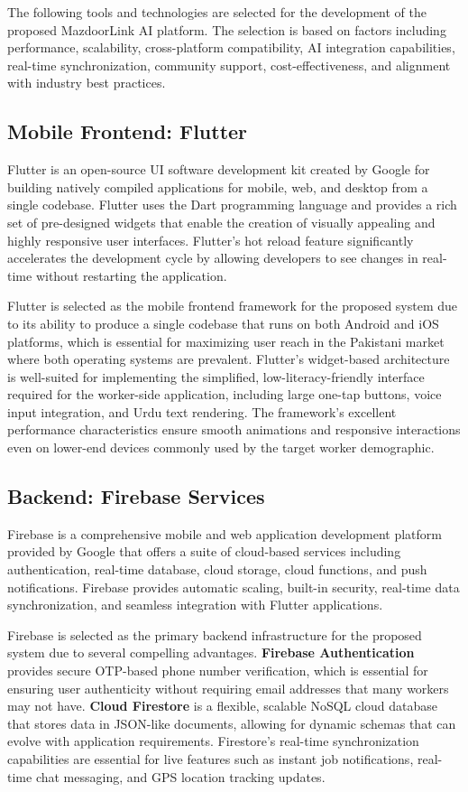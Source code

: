 \documentclass[12pt,a4paper]{report}
\begin{document}
The following tools and technologies are selected for the development of the proposed MazdoorLink AI platform. The selection is based on factors including performance, scalability, cross-platform compatibility, AI integration capabilities, real-time synchronization, community support, cost-effectiveness, and alignment with industry best practices.

\subsection{Mobile Frontend: Flutter}
Flutter is an open-source UI software development kit created by Google for building natively compiled applications for mobile, web, and desktop from a single codebase. Flutter uses the Dart programming language and provides a rich set of pre-designed widgets that enable the creation of visually appealing and highly responsive user interfaces. Flutter's hot reload feature significantly accelerates the development cycle by allowing developers to see changes in real-time without restarting the application.

Flutter is selected as the mobile frontend framework for the proposed system due to its ability to produce a single codebase that runs on both Android and iOS platforms, which is essential for maximizing user reach in the Pakistani market where both operating systems are prevalent. Flutter's widget-based architecture is well-suited for implementing the simplified, low-literacy-friendly interface required for the worker-side application, including large one-tap buttons, voice input integration, and Urdu text rendering. The framework's excellent performance characteristics ensure smooth animations and responsive interactions even on lower-end devices commonly used by the target worker demographic.

\subsection{Backend: Firebase Services}
Firebase is a comprehensive mobile and web application development platform provided by Google that offers a suite of cloud-based services including authentication, real-time database, cloud storage, cloud functions, and push notifications. Firebase provides automatic scaling, built-in security, real-time data synchronization, and seamless integration with Flutter applications.

Firebase is selected as the primary backend infrastructure for the proposed system due to several compelling advantages. \textbf{Firebase Authentication} provides secure OTP-based phone number verification, which is essential for ensuring user authenticity without requiring email addresses that many workers may not have. \textbf{Cloud Firestore} is a flexible, scalable NoSQL cloud database that stores data in JSON-like documents, allowing for dynamic schemas that can evolve with application requirements. Firestore's real-time synchronization capabilities are essential for live features such as instant job notifications, real-time chat messaging, and GPS location tracking updates.
\end{document}
